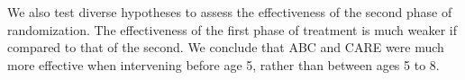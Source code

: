 \noindent We also test diverse hypotheses to assess the effectiveness of the second phase of randomization. The effectiveness of the first phase of treatment is much weaker if compared to that of the second. We conclude that ABC and CARE were much more effective when intervening before age 5, rather than between ages 5 to 8.\\

